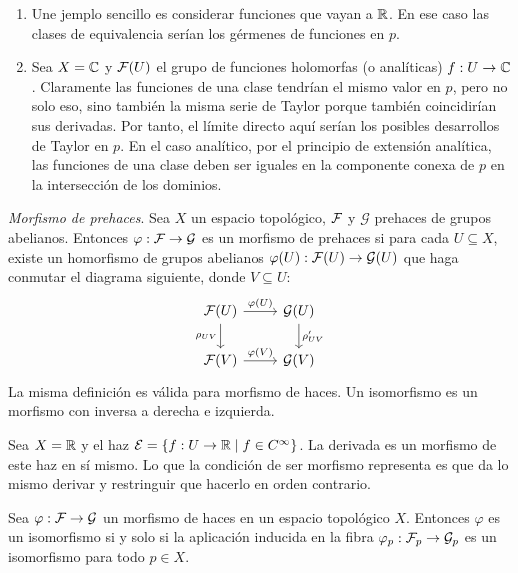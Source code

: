 \documentclass[GA.tex]{subfiles}
\begin{document}
\begin{ejs}
\begin{enumerate}
\item Une jemplo sencillo es considerar funciones que vayan a $\mathbb{R}$. En ese caso las clases de equivalencia serían los gérmenes de funciones en $p$. 

\item Sea $X=\mathbb{C}$ y $\mathcal{F}(U)$ el grupo de funciones holomorfas (o analíticas) $f:U\to\mathbb{C}$. Claramente las funciones de una clase tendrían el mismo valor en $p$, pero no solo eso, sino también la misma serie de Taylor porque también coincidirían sus derivadas. Por tanto, el límite directo aquí serían los posibles desarrollos de Taylor en $p$. En el caso analítico, por el principio de extensión analítica, las funciones de una clase deben ser iguales en la componente conexa de $p$ en la intersección de los dominios. 
\end{enumerate}
\end{ejs}


\begin{defi}
\emph{Morfismo de prehaces}. Sea $X$ un espacio topológico, $\mathcal{F}$ y $\mathcal{G}$ prehaces de grupos abelianos. Entonces $\varphi:\mathcal{F}\to\mathcal{G}$ es un morfismo de prehaces si para cada $U\subseteq X$, existe un homorfismo de grupos abelianos $\varphi(U):\mathcal{F}(U)\to\mathcal{G}(U)$ que haga conmutar el diagrama siguiente, donde $V\subseteq U$:
\[
\begin{tikzcd}
\calF(U)\arrow[r, "\varphi(U)"]\arrow[d, "\rho_{UV}"'] & \calG(U)\arrow[d, "\rho'_{UV}"]\\
\calF(V)\arrow[r, "\varphi(V)"] & \calG(V)
\end{tikzcd}
\]
La misma definición es válida para morfismo de haces. Un isomorfismo es un morfismo con inversa a derecha e izquierda. 
\end{defi}

\begin{ej}
Sea $X=\mathbb{R}$ y el haz $\mathcal{E}=\{f:U\to \mathbb{R}\mid f\in C^{\infty}\}$. La derivada es un morfismo de este haz en sí mismo. Lo que la condición de ser morfismo representa es que da lo mismo derivar y restringuir que hacerlo en orden contrario.
\end{ej}


\begin{prop}
Sea $\varphi:\mathcal{F}\to\mathcal{G}$ un morfismo de haces en un espacio topológico $X$. Entonces $\varphi$ es un isomorfismo si y solo si la aplicación inducida en la fibra $\varphi_p:\mathcal{F}_p\to\mathcal{G}_p$ es un isomorfismo para todo $p\in X$.
\end{prop}
\end{document}

